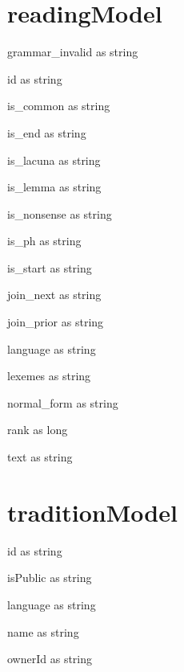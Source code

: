 \section{readingModel}
\begin{property}
grammar\_invalid as string
\end{property}
\begin{property}
id as string
\end{property}
\begin{property}
is\_common as string
\end{property}
\begin{property}
is\_end as string
\end{property}
\begin{property}
is\_lacuna as string
\end{property}
\begin{property}
is\_lemma as string
\end{property}
\begin{property}
is\_nonsense as string
\end{property}
\begin{property}
is\_ph as string
\end{property}
\begin{property}
is\_start as string
\end{property}
\begin{property}
join\_next as string
\end{property}
\begin{property}
join\_prior as string
\end{property}
\begin{property}
language as string
\end{property}
\begin{property}
lexemes as string
\end{property}
\begin{property}
normal\_form as string
\end{property}
\begin{property}
rank as long
\end{property}
\begin{property}
text as string
\end{property}
\section{traditionModel}
\begin{property}
id as string
\end{property}
\begin{property}
isPublic as string
\end{property}
\begin{property}
language as string
\end{property}
\begin{property}
name as string
\end{property}
\begin{property}
ownerId as string
\end{property}
